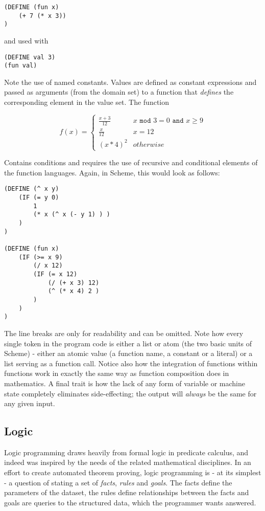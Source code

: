 \begin{lstlisting}
(DEFINE (fun x)
    (+ 7 (* x 3))
)
\end{lstlisting}

and used with 

\begin{lstlisting}
(DEFINE val 3)
(fun val)
\end{lstlisting}

Note the use of named constants. Values are defined as constant expressions and passed as arguments (from the domain set) to a function that \emph{defines} the corresponding element in the value set. The function

\[
f(x) =
\begin{cases} \frac{x+3}{12} & x \texttt{ mod } 3 = 0 \texttt{ and } x \geq 9
\\
\frac{x}{12} & x = 12
\\
(x * 4)^2 & otherwise
\end{cases}
\]

Contains conditions and requires the use of recursive and conditional elements of the function languages. Again, in Scheme, this would look as follows:

\begin{lstlisting}
(DEFINE (^ x y)
    (IF (= y 0)
        1
        (* x (^ x (- y 1) ) )
    )
)

(DEFINE (fun x)
    (IF (>= x 9)
        (/ x 12)
        (IF (= x 12)
            (/ (+ x 3) 12)
            (^ (* x 4) 2 )
        )
    )
)           
\end{lstlisting}

The line breaks are only for readability and can be omitted. Note how every single token in the program code is either a list or atom (the two basic units of Scheme) - either an atomic value (a function name, a constant or a literal) or a list serving as a function call. Notice also how the integration of functions within functions work in exactly the same way as function composition does in mathematics. A final trait is how the lack of any form of variable or machine state completely eliminates side-effecting; the output will \emph{always} be the same for any given input.

\subsection{Logic}
Logic programming draws heavily from formal logic in predicate calculus, and indeed was inspired by the needs of the related mathematical disciplines. In an effort to create automated theorem proving, logic programming is - at its simplest - a question of stating a set of \emph{facts}, \emph{rules} and \emph{goals}. The facts define the parameters of the dataset, the rules define relationships between the facts and goals are queries to the structured data, which the programmer wants answered.

